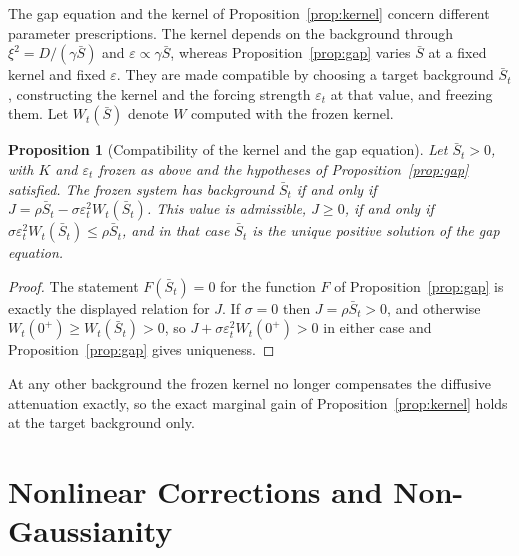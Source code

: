 \documentclass[11pt]{article}
\newtheorem{proposition}{Proposition}[section]
\theoremstyle{definition}
\theoremstyle{remark}
\newcommand{\Sb}{\bar{S}}
\begin{document}
The gap equation and the kernel of Proposition~\ref{prop:kernel} concern different parameter prescriptions. The kernel depends on the background through $\xi^2=D/(\gamma\Sb)$ and $\varepsilon\propto\gamma\Sb$, whereas Proposition~\ref{prop:gap} varies $\Sb$ at a fixed kernel and fixed $\varepsilon$. They are made compatible by choosing a target background $\Sb_t$, constructing the kernel and the forcing strength $\varepsilon_t$ at that value, and freezing them. Let $W_t(\Sb)$ denote $W$ computed with the frozen kernel.

\begin{proposition}[Compatibility of the kernel and the gap equation]\label{prop:compat}
Let $\Sb_t>0$, with $K$ and $\varepsilon_t$ frozen as above and the hypotheses of Proposition~\ref{prop:gap} satisfied. The frozen system has background $\Sb_t$ if and only if $J=\rho\Sb_t-\sigma\varepsilon_t^2W_t(\Sb_t)$. This value is admissible, $J\ge0$, if and only if $\sigma\varepsilon_t^2W_t(\Sb_t)\le\rho\Sb_t$, and in that case $\Sb_t$ is the unique positive solution of the gap equation.
\end{proposition}

\begin{proof}
The statement $F(\Sb_t)=0$ for the function $F$ of Proposition~\ref{prop:gap} is exactly the displayed relation for $J$. If $\sigma=0$ then $J=\rho\Sb_t>0$, and otherwise $W_t(0^+)\ge W_t(\Sb_t)>0$, so $J+\sigma\varepsilon_t^2W_t(0^+)>0$ in either case and Proposition~\ref{prop:gap} gives uniqueness.
\end{proof}

At any other background the frozen kernel no longer compensates the diffusive attenuation exactly, so the exact marginal gain of Proposition~\ref{prop:kernel} holds at the target background only.

\section{Nonlinear Corrections and Non-Gaussianity}
\end{document}
